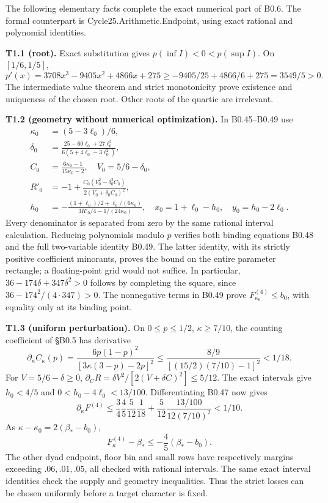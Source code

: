 \documentclass[11pt,a4paper]{article}
\newcommand{\sourcecode}[1]{{\small\ttfamily #1}}
\begin{document}
The following elementary facts complete the exact numerical part of
B0.6. The formal counterpart is \sourcecode{Cycle25.\allowbreak{}Arithmetic.\allowbreak{}Endpoint},
using exact rational and polynomial identities.

\textbf{T1.1 (root).} Exact substitution gives
\(p(\inf I)<0<p(\sup I)\). On \([1/6,\allowbreak{}1/5]\), \[
p'(x)=3708x^3-9405x^2+4866x+275
\ge-9405/25+4866/6+275=3549/5>0.
\] The intermediate value theorem and strict monotonicity prove
existence and uniqueness of the chosen root. Other roots of the quartic
are irrelevant.

\textbf{T1.2 (geometry without numerical optimization).} In B0.45--B0.49
use \[
\begin{split}
\kappa_0&=(5-3\ell_0)/6,\\
\delta_0&=\frac{25-60\ell_0+27\ell_0^2}{6(5+4\ell_0-3\ell_0^2)},\\
C_0&=\frac{6\kappa_0-1}{15\kappa_0-2},\quad V_0=5/6-\delta_0,\\
R'_0&=-1+\frac{C_0(V_0^2-\delta_0^2C_0)}{2(V_0+\delta_0C_0)^2},\\
h_0&=-\frac{(1+\ell_0)/2+\ell_0/(6\kappa_0)}{3R'_0/4-1/(24\kappa_0)},\quad
x_0=1+\ell_0-h_0,\quad y_0=h_0-2\ell_0.
\end{split}
\] Every denominator is separated from zero by the same rational
interval calculation. Reducing polynomials modulo \(p\) verifies both
binding equations B0.48 and the full two-variable identity B0.49. The
latter identity, with its strictly positive coefficient minorants,
proves the bound on the entire parameter rectangle; a floating-point
grid would not suffice. In particular, \(36-174\delta+347\delta^2>0\)
follows by completing the square, since \(36-174^2/(4\cdot347)>0\). The
nonnegative terms in B0.49 prove \(F^{(4)}_{\kappa_0}\le b_0\), with
equality only at its binding point.

\textbf{T1.3 (uniform perturbation).} On \(0\le p\le1/2\),
\(\kappa\ge7/10\), the counting coefficient of §B0.5 has derivative \[
\partial_\kappa C_\kappa(p)
=\frac{6p(1-p)^2}{[3\kappa(3-p)-2p]^2}
\le\frac{8/9}{[(15/2)(7/10)-1]^2}<1/18.
\] For \(V=5/6-\delta\ge0\),
\(\partial_C R=\delta V^2/[2(V+\delta C)^2]\le5/12\). The exact
intervals give \(h_0<4/5\) and \(0<h_0-4\ell_0<13/100\). Differentiating
B0.47 now gives \[
\partial_\kappa F^{(4)}
\le\frac34\frac45\frac5{12}\frac1{18}
 +\frac5{12}\frac{13/100}{12(7/10)^2}<1/10.
\] As \(\kappa-\kappa_0=2(\beta_*-b_0)\), \[
F^{(4)}_\kappa-\beta_*\le-\frac45(\beta_*-b_0).
\] The other dyad endpoint, floor bin and small rows have respectively
margins exceeding \(.06,\allowbreak{}.01,\allowbreak{}.05\), all checked with rational intervals.
The same exact interval identities check the supply and geometry
inequalities. Thus the strict losses can be chosen uniformly before a
target character is fixed.
\end{document}
